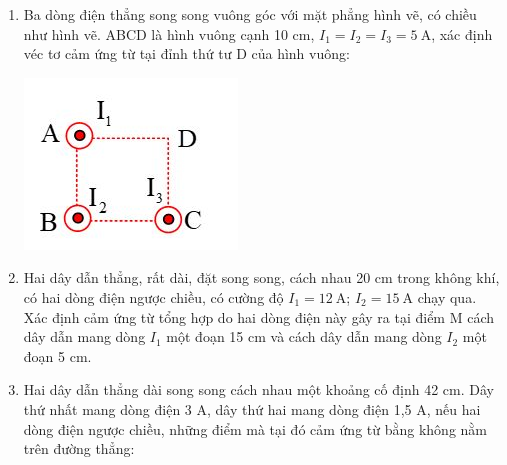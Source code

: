 \begin{enumerate}
{
	}
	\item {Ba dòng điện thẳng song song vuông góc với mặt phẳng hình vẽ, có chiều như hình vẽ. ABCD là hình vuông cạnh 10 cm, $I_1 = I_2 = I_3 = 5\ \text{A}$, xác định véc tơ cảm ứng từ tại đỉnh thứ tư D của hình vuông:
		\begin{center}
			\includegraphics[scale=0.6]{../figs/VN11-PH-26-P-017-1-5.JPG}
		\end{center}
	}
	\item {Hai dây dẫn thẳng, rất dài, đặt song song, cách nhau 20 cm trong không khí, có hai dòng điện ngược chiều, có cường độ $I_1 = 12\ \text{A}$; $I_2 = 15\ \text{A}$ chạy qua. Xác định cảm ứng từ tổng hợp do hai dòng điện này gây ra tại điểm M cách dây dẫn mang dòng $I_1$ một đoạn 15 cm và cách dây dẫn mang dòng $I_2$ một đoạn 5 cm.
	}
	\item{Hai dây dẫn thẳng dài song song cách nhau một khoảng cố định 42 cm. Dây thứ nhất mang dòng điện 3 A, dây thứ hai mang dòng điện 1,5 A, nếu hai dòng điện ngược chiều, những điểm mà tại đó cảm ứng từ bằng không nằm trên đường thẳng:
}
\end{enumerate}
